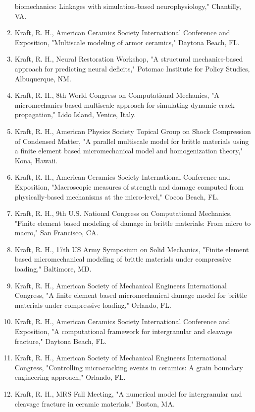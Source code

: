 \documentclass[
]{article}
\begin{document}
\begin{enumerate}
  biomechanics: Linkages with simulation-based neurophysiology,"
  Chantilly, VA.
\item
  Kraft, R. H., American Ceramics Society International Conference and
  Exposition, "Multiscale modeling of armor ceramics," Daytona Beach,
  FL.
\item
  Kraft, R. H., Neural Restoration Workshop, "A structural
  mechanics-based approach for predicting neural deficits," Potomac
  Institute for Policy Studies, Albuquerque, NM.
\item
  Kraft, R. H., 8th World Congress on Computational Mechanics, "A
  micromechanics-based multiscale approach for simulating dynamic crack
  propagation," Lido Island, Venice, Italy.
\item
  Kraft, R. H., American Physics Society Topical Group on Shock
  Compression of Condensed Matter, "A parallel multiscale model for
  brittle materials using a finite element based micromechanical model
  and homogenization theory," Kona, Hawaii.
\item
  Kraft, R. H., American Ceramics Society International Conference and
  Exposition, "Macroscopic measures of strength and damage computed from
  physically-based mechanisms at the micro-level," Cocoa Beach, FL.
\item
  Kraft, R. H., 9th U.S. National Congress on Computational Mechanics,
  "Finite element based modeling of damage in brittle materials: From
  micro to macro," San Francisco, CA.
\item
  Kraft, R. H., 17th US Army Symposium on Solid Mechanics, "Finite
  element based micromechanical modeling of brittle materials under
  compressive loading," Baltimore, MD.
\item
  Kraft, R. H., American Society of Mechanical Engineers International
  Congress, "A finite element based micromechanical damage model for
  brittle materials under compressive loading," Orlando, FL.
\item
  Kraft, R. H., American Ceramics Society International Conference and
  Exposition, "A computational framework for intergranular and cleavage
  fracture," Daytona Beach, FL.
\item
  Kraft, R. H., American Society of Mechanical Engineers International
  Congress, "Controlling microcracking events in ceramics: A grain
  boundary engineering approach," Orlando, FL.
\item
  Kraft, R. H., MRS Fall Meeting, "A numerical model for intergranular
  and cleavage fracture in ceramic materials," Boston, MA.
\end{enumerate}
\end{document}
